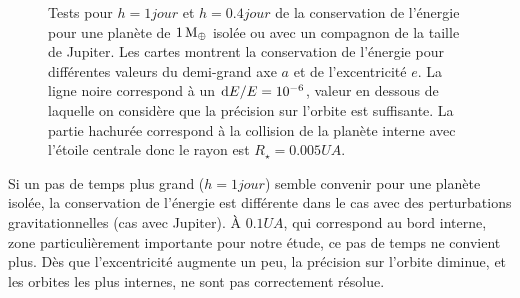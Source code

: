 \begin{figure}[htb]
\centering
{}\hfill
{}

\hfill
{}


\caption{Tests pour $h=1\unit{jour}$ et $h=0.4\unit{jour}$ de la conservation de l'énergie pour une planète de $1\mathrm{\thinspace M_\oplus}$ isolée ou avec un compagnon de la taille de Jupiter. Les cartes montrent la conservation de l'énergie pour différentes valeurs du demi-grand axe $a$ et de l'excentricité $e$. La ligne noire correspond à un $\operatorname{d \!} E/E=10^{-6}$, valeur en dessous de laquelle on considère que la précision sur l'orbite est suffisante. La partie hachurée correspond à la collision de la planète interne avec l'étoile centrale donc le rayon est $R_\star=0.005\unit{UA}$.}\label{fig:accuracy_maps}
\end{figure}

Si un pas de temps plus grand ($h=1\unit{jour}$) semble convenir pour une planète isolée, la conservation de l'énergie est différente dans le cas avec des perturbations gravitationnelles (cas avec Jupiter). À $0.1\unit{UA}$, qui correspond au bord interne, zone particulièrement importante pour notre étude, ce pas de temps ne convient plus. Dès que l'excentricité augmente un peu, la précision sur l'orbite diminue, et les orbites les plus internes,  ne sont pas correctement résolue.

